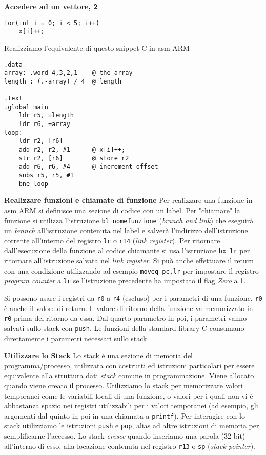 \begin{exmp}
\textbf{Accedere ad un vettore, 2}
\begin{lstlisting}
for(int i = 0; i < 5; i++)
	x[i]++;
\end{lstlisting}

Realizziamo l'equivalente di questo snippet C in asm ARM


\begin{lstlisting}[style=armn]
.data
array: .word 4,3,2,1    @ the array
length : (.-array) / 4	@ length

.text
.global main
	ldr r5, =length
	ldr r6, =array
loop:
	ldr r2, [r6]
	add r2, r2, #1		@ x[i]++;
	str r2, [r6]		@ store r2
	add r6, r6, #4 		@ increment offset
	subs r5, r5, #1
	bne loop
\end{lstlisting}
\end{exmp}

\begin{exmp}
\textbf{Realizzare funzioni e chiamate di funzione}
Per realizzare una funzione in asm ARM si definisce una sezione di codice
con un label. Per "chiamare" la funzione si utilizza l'istruzione \texttt{bl nomefunzione}
(\textit{branch and link}) che eseguirà un \textit{branch} all'istruzione
contenuta nel label e salverà l'indirizzo dell'istruzione corrente all'interno del registro
\texttt{lr} o \texttt{r14} (\textit{link register}). Per ritornare dall'esecuzione
della funzione al codice chiamante si usa l'istruzione \texttt{bx lr} per ritornare
all'istruzione salvata nel \textit{link register}. Si può anche effettuare il return con una
condizione utilizzando ad esempio \texttt{moveq pc,lr} per impostare il registro
\textit{program counter} a \texttt{lr} se l'istruzione precedente ha impostato il flag
\textit{Zero} a 1.

Si possono usare i registri da \texttt{r0} a \texttt{r4} (escluso) per i parametri di una funzione.
\texttt{r0} è anche il valore di return. Il valore di ritorno della funzione va memorizzato in \texttt{r0}
prima del ritorno da essa.
Dal quarto parametro in poi, i parametri vanno salvati sullo stack con \texttt{push}.
Le funzioni della standard library C consumano direttamente i parametri necessari sullo stack.
\end{exmp}

\begin{defn}
	\textbf{Utilizzare lo Stack}
	Lo stack è una sezione di memoria del programma/processo, utilizzata con costrutti ed istruzioni
	particolari per essere equivalente alla struttura dati \textit{stack} comune in programmazione. Viene
	allocato quando viene creato il processo. Utilizziamo lo stack per memorizzare
	valori temporanei come le variabili locali di una funzione, o valori per i quali non vi è abbastanza
	spazio nei registri utilizzabili per i valori temporanei (ad esempio, gli argomenti dal quinto in poi in una chiamata a \texttt{printf}).
	Per interagire con lo stack utilizziamo le istruzioni \texttt{push} e \texttt{pop}, alias ad altre istruzioni di memoria per
	semplificarne l'accesso. Lo stack \textit{cresce} quando inseriamo una parola (32 bit) all'interno di esso, alla locazione
	contenuta nel registro \texttt{r13} o \texttt{sp} (\textit{stack pointer}).
\end{defn}


